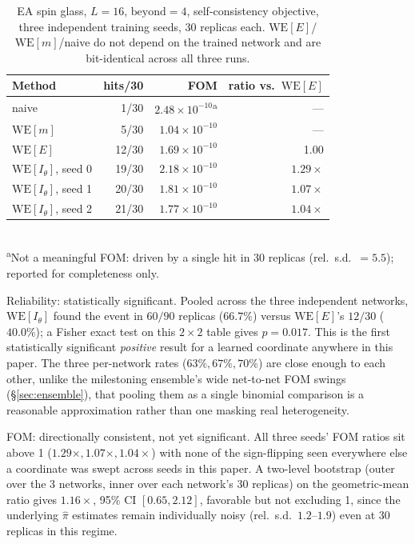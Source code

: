 \documentclass[a4paper,fleqn]{cas-sc}
\begin{document}
\begin{table}[h]
	\centering\small
	\caption{EA spin glass, $L=16$, $\mathrm{beyond}=4$, self-consistency objective,
		three independent training seeds, 30 replicas each. $\mathrm{WE}[E]$/$\mathrm{WE}[m]$/naive
		do not depend on the trained network and are bit-identical across all three runs.}
	\label{tab:selfconsistdeep}
	\begin{tabular}{lrrr}
		\toprule
		Method & hits/30 & FOM & ratio vs.\ $\mathrm{WE}[E]$ \\
		\midrule
		naive & 1/30 & $2.48\times10^{-10}$\textsuperscript{a} & --- \\
		$\mathrm{WE}[m]$ & 5/30 & $1.04\times10^{-10}$ & --- \\
		$\mathrm{WE}[E]$ & 12/30 & $1.69\times10^{-10}$ & 1.00 \\
		$\mathrm{WE}[I_\theta]$, seed 0 & 19/30 & $2.18\times10^{-10}$ & $1.29\times$ \\
		$\mathrm{WE}[I_\theta]$, seed 1 & 20/30 & $1.81\times10^{-10}$ & $1.07\times$ \\
		$\mathrm{WE}[I_\theta]$, seed 2 & 21/30 & $1.77\times10^{-10}$ & $1.04\times$ \\
		\bottomrule
	\end{tabular}
	\\[2pt]
	{\footnotesize\textsuperscript{a}Not a meaningful FOM: driven by a single hit in 30
		replicas (rel.\ s.d.\ $=5.5$); reported for completeness only.}
\end{table}

Reliability: statistically significant. Pooled across the three independent
networks, $\mathrm{WE}[I_\theta]$ found the event in $60/90$ replicas ($66.7\%$) versus
$\mathrm{WE}[E]$'s $12/30$ ($40.0\%$); a Fisher exact test on this $2\times2$ table gives
$p=0.017$. This is the first statistically significant \emph{positive} result for a
learned coordinate anywhere in this paper. The three per-network rates ($63\%, 67\%,
70\%$) are close enough to each other, unlike the milestoning ensemble's wide
net-to-net FOM swings (\S\ref{sec:ensemble}), that pooling them as a single binomial
comparison is a reasonable approximation rather than one masking real heterogeneity.

FOM: directionally consistent, not yet significant. All three seeds' FOM
ratios sit above 1 ($1.29\times, 1.07\times, 1.04\times$) with none of the sign-flipping
seen everywhere else a coordinate was swept across seeds in this paper. A two-level
bootstrap (outer over the 3 networks, inner over each network's 30 replicas) on the
geometric-mean ratio gives $1.16\times$, 95\% CI $[0.65, 2.12]$, favorable but not
excluding 1, since the underlying $\hat\pi$ estimates remain individually noisy
(rel.\ s.d.\ $1.2$--$1.9$) even at 30 replicas in this regime.
\end{document}
